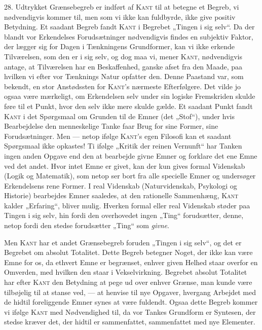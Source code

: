 \documentclass[12pt]{article}
\newcommand{\opage}[1]{\marginnote{\footnotesize\textit{[#1]}}}
\begin{document}
\opage{74}28. Udtrykket Grænsebegreb er indført af \textsc{Kant} til at betegne
et Begreb, vi nødvendigvis kommer til, men som vi ikke kan fuldbyrde, ikke give
positiv Betydning. Et saadant Begreb fandt \textsc{Kant} i Begrebet „Tingen i
sig selv“. Da der blandt vor Erkendelses Forudsætninger nødvendigvis findes en
subjektiv Faktor, der lægger sig for Dagen i Tænkningens Grundformer, kan vi
ikke erkende Tilværelsen, som den er i sig selv, og dog maa vi, mener
\textsc{Kant}, nødvendigvis antage, at Tilværelsen har en Beskaffenhed, ganske
afset fra den Maade, paa hvilken vi efter vor Tænknings Natur opfatter den.
Denne Paastand var, som bekendt, en stor Anstødssten for \textsc{Kant}'s
nærmeste Efterfølgere. Det vilde jo ogsaa være mærkeligt, om Erkendelsen selv
under sin logiske Fremskriden skulde føre til et Punkt, hvor den selv ikke mere
skulde gælde. Et saadant Punkt fandt \textsc{Kant} i det Spørgsmaal om Grunden
til de Emner (det „Stof“), under hvis Bearbejdelse den menneskelige Tanke faar
Brug for sine Former, sine Forudsætninger. Men --- netop ifølge \textsc{Kant}'s
egen Filosofi kan et saadant Spørgsmaal ikke opkastes! Ti ifølge „Kritik der
reinen Vernunft“ har Tanken ingen anden Opgave end den at bearbejde givne Emner
og forklare det ene Emne ved det andet. Hvor intet Emne er givet, kan der kun
gives formal Videnskab (Logik og Matematik), som netop ser bort fra alle
specielle Emner og undersøger Erkendelsens rene Former. I real Videnskab
(Naturvidenskab, Psykologi og Historie) bearbejdes Emner saaledes, at den
rationelle Sammenhæng, \textsc{Kant} kalder „Erfaring“, bliver mulig. Hverken
formal eller real Videnskab støder paa Tingen i sig selv, hin fordi den
overhovedet ingen „Ting“ forudsætter, denne, netop fordi den stedse forudsætter
„Ting“ som \emph{givne}.

Men \textsc{Kant} har et andet Grænsebegreb foruden „Tingen i sig selv“, og det
er Begrebet om absolut Totalitet. Dette Begreb betegner Noget, der ikke kan være
Emne for os, da ethvert Emne er begrænset, enhver given Helhed staar overfor en
Omverden, med hvilken den staar i Vekselvirkning. Begrebet absolut Totalitet har
efter \textsc{Kant} den Betydning at pege ud over enhver Grænse, man kunde være
tilbøjelig til at stanse ved, --- at henvise til nye Opgaver, hvergang Arbejdet
med de hidtil foreliggende Emner synes at være fuldendt. Ogsaa dette Begreb
kommer vi ifølge \textsc{Kant} med Nødvendighed til, da vor Tankes Grundform er
Syntesen, der stedse kræver det, der hidtil er sammenfattet, sammenfattet med
nye Elementer.
\end{document}
